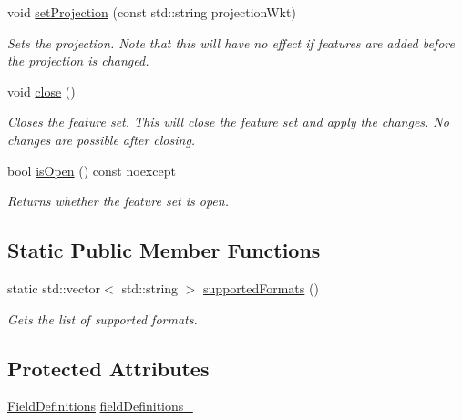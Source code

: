 \begin{DoxyCompactItemize}
void \hyperlink{group___vector_module_gab665679d2cea8d9b0c324fd52410e181}{set\+Projection} (const std\+::string projection\+Wkt)
\begin{DoxyCompactList}\small\item\em Sets the projection. Note that this will have no effect if features are added before the projection is changed. \end{DoxyCompactList}\item 
void \hyperlink{group___vector_module_gabd53e45c4396d9a6798453b82fb396ac}{close} ()
\begin{DoxyCompactList}\small\item\em Closes the feature set. This will close the feature set and apply the changes. No changes are possible after closing. \end{DoxyCompactList}\item 
bool \hyperlink{group___vector_module_ga452851f214ba915b11acdac63fe3d6ba}{is\+Open} () const noexcept
\begin{DoxyCompactList}\small\item\em Returns whether the feature set is open. \end{DoxyCompactList}\end{DoxyCompactItemize}
\subsection*{Static Public Member Functions}
\begin{DoxyCompactItemize}
\item 
static std\+::vector$<$ std\+::string $>$ \hyperlink{classdg_1_1deepcore_1_1vector_1_1_feature_set_a157fb6015d620a272b8c8395daea2c03}{supported\+Formats} ()
\begin{DoxyCompactList}\small\item\em Gets the list of supported formats. \end{DoxyCompactList}\end{DoxyCompactItemize}
\subsection*{Protected Attributes}
\begin{DoxyCompactItemize}
\item 
\hyperlink{namespacedg_1_1deepcore_1_1vector_a89a39c2fa657ff95f116cfed4a951386}{Field\+Definitions} \hyperlink{classdg_1_1deepcore_1_1vector_1_1_feature_set_a0fdfbe8046808f547dd24594b45be9cf}{field\+Definitions\+\_\+}
\end{DoxyCompactItemize}


